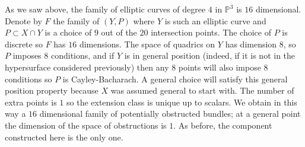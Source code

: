 \documentclass{amsart}
\theoremstyle{plain}
\numberwithin{equation}{section}
\begin{document}
As we saw above, the family of elliptic curves of degree $4$ in ${{\mathbb P}} ^3$ is $16$
dimensional. Denote by $F$ the family of $(Y,P)$ where $Y$ is such an elliptic curve
and $P\subset X\cap Y$ is a choice of $9$ out of the $20$ intersection points.
The choice of $P$ is discrete so $F$ has $16$ dimensions. The space of quadrics on
$Y$ has dimension $8$, so $P$ imposes $8$ conditions, and if $Y$ is in
general position (indeed, if it is not in the hypersurface considered previously)
then any $8$ points will also impose $8$ conditions so $P$ is Cayley-Bacharach. 
A general choice will satisfy this general position
property because $X$ was assumed general to start with.
The number of extra  points is $1$ so the extension class
is unique up to scalars. We obtain in this way a $16$ dimensional family
of potentially obstructed bundles; at a general point the dimension of the space of obstructions
is $1$. 
As before, the component constructed here is the only one. 
\end{document}
